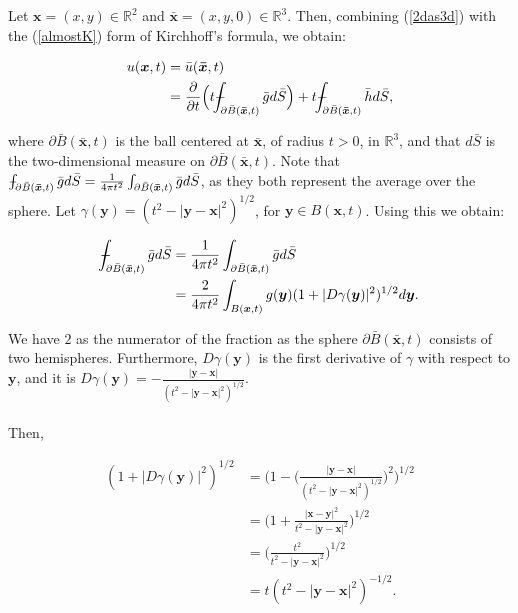 \documentclass[a4paper, 12pt]{article}
\def\Xint#1{\mathchoice
{\XXint\displaystyle\textstyle{#1}}%
{\XXint\textstyle\scriptstyle{#1}}%
{\XXint\scriptstyle\scriptscriptstyle{#1}}%
{\XXint\scriptscriptstyle\scriptscriptstyle{#1}}%
\!\int}
\def\XXint#1#2#3{{\setbox0=\hbox{$#1{#2#3}{\int}$ }
\vcenter{\hbox{$#2#3$ }}\kern-.6\wd0}}
\def\dashint{\Xint-}
\numberwithin{equation}{section}
\begin{document}
Let $\boldsymbol{x}=(x,y)\in \mathbb{R}^2$ and $\boldsymbol{\bar{x}}=(x,y, 0)\in \mathbb{R}^3$. Then, combining (\ref{2das3d}) with the (\ref{almostK}) form of Kirchhoff's formula, we obtain:

\begin{equation} \label{star}
    \begin{aligned}
        u(\boldsymbol{x},t)&=\bar{u}(\boldsymbol{\bar{x}}, t)\\
        &=\diffp[1]{}{t}\Big(t\dashint_{\partial \bar{B}(\boldsymbol{\bar{x}}, t)} \bar{g} d\bar{S}\Big)+t \dashint_{\partial \bar{B}(\boldsymbol{\bar{x}}, t)} \bar{h}d\bar{S},
    \end{aligned}
\end{equation}

where $\partial\bar{B}(\boldsymbol{\bar{x}},t)$ is the ball centered at $\boldsymbol{\bar{x}}$, of radius $t>0$, in $\mathbb{R}^3$, and that $d\bar{S}$ is the two-dimensional measure on 
$\partial\bar{B}(\boldsymbol{\bar{x}},t)$. Note that $\dashint_{\partial \bar{B}(\boldsymbol{\bar{x}}, t)} \bar{g} d\bar{S}=\frac{1}{4\pi t^2}\int_{\partial \bar{B}(\boldsymbol{\bar{x}}, t)}\bar{g} d\bar{S}$, as they
both represent the average over the sphere. Let $\gamma (\boldsymbol{y})=(t^2-|\boldsymbol{y}-\boldsymbol{x}|^2)^{1/2}$, for $\boldsymbol{y} \in B(\boldsymbol{x}, t)$. Using 
this we obtain:

\begin{equation*}
    \begin{aligned}
        \dashint_{\partial \bar{B}(\boldsymbol{\bar{x}}, t)} \bar{g} d\bar{S}&=\frac{1}{4\pi t^2}\int_{\partial \bar{B}(\boldsymbol{\bar{x}}, t)}\bar{g} d\bar{S}\\
        &=\frac{2}{4 \pi t^2} \int_{B(\boldsymbol{x}, t)} g(\boldsymbol{y})(1+|D\gamma (\boldsymbol{y})|^2)^{1/2}d\boldsymbol{y}.
    \end{aligned}
\end{equation*}

We have $2$ as the numerator of the fraction as the sphere $\partial\bar{B}(\boldsymbol{\bar{x}}, t)$ consists of two hemispheres. Furthermore, $D\gamma (\boldsymbol{y})$ is the first derivative of $\gamma$ with respect to $\boldsymbol{y}$, and it is
$D\gamma (\boldsymbol{y})=-\frac{|\boldsymbol{y}-\boldsymbol{x}|}{(t^2-|\boldsymbol{y}-\boldsymbol{x}|^2)^{1/2}}$. 
\\
\\

Then,

\begin{equation*}
    \begin{aligned}
        (1+|D\gamma (\boldsymbol{y})|^2)^{1/2}&=\Big(1-\Big(\frac{|\boldsymbol{y}-\boldsymbol{x}|}{(t^2-|\boldsymbol{y}-\boldsymbol{x}|^2)^{1/2}}\Big)^2\Big)^{1/2}\\
        &=\Big(1+\frac{|\boldsymbol{x}-\boldsymbol{y}|^2}{t^2-|\boldsymbol{y}-\boldsymbol{x}|^2}\Big)^{1/2}\\
        &=\Big(\frac{t^2}{t^2-|\boldsymbol{y}-\boldsymbol{x}|^2}\Big)^{1/2}\\
        &=t(t^2-|\boldsymbol{y}-\boldsymbol{x}|^2)^{-1/2}.
    \end{aligned}
\end{equation*}
\end{document}
